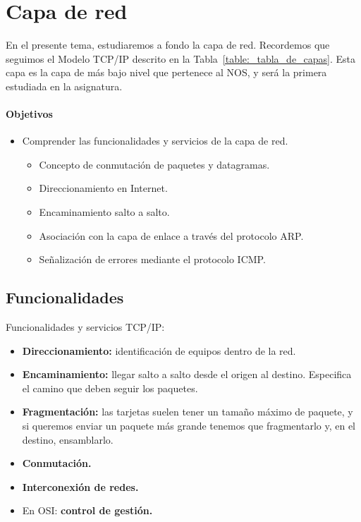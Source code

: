 \chapter{Capa de red}

En el presente tema, estudiaremos a fondo la capa de red. Recordemos que seguimos el Modelo TCP/IP descrito en la Tabla~\ref{table:_tabla_de_capas}.
Esta capa es la capa de más bajo nivel que pertenece al \acrshort{NOS}, y será la primera estudiada en la asignatura.

\subsubsection{Objetivos}

\begin{itemize}
    \item Comprender las funcionalidades y servicios de la capa de red.
        \begin{itemize}
            \item Concepto de conmutación de paquetes y datagramas. 
            \item Direccionamiento en Internet.
            \item Encaminamiento salto a salto.
            \item Asociación con la capa de enlace a través del protocolo \acrshort{ARP}.
            \item Señalización de errores mediante el protocolo \acrshort{ICMP}.
        \end{itemize}
\end{itemize}

\section{Funcionalidades}

Funcionalidades y servicios TCP\@/IP\@:
\begin{itemize}
    \item \textbf{Direccionamiento:} identificación de equipos dentro de la red.
    \item \textbf{Encaminamiento:} llegar salto a salto desde el origen al destino. Especifica el camino que deben seguir los paquetes.
    \item \textbf{Fragmentación:} las tarjetas suelen tener un tamaño máximo de paquete, y si queremos enviar un paquete más grande tenemos que fragmentarlo y, en el destino, ensamblarlo. 
    \item \textbf{Conmutación.} 
    \item \textbf{Interconexión de redes.}
    \item En \acrshort{OSI}: \textbf{control de gestión.}
\end{itemize}

